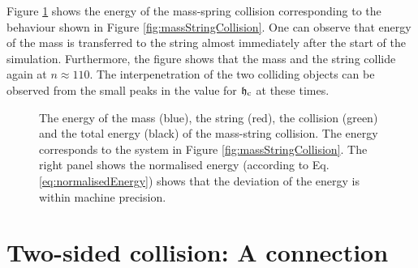 Figure \ref{fig:massStringCollisionEnergy} shows the energy of the mass-spring collision corresponding to the behaviour shown in Figure \ref{fig:massStringCollision}. One can observe that energy of the mass is transferred to the string almost immediately after the start of the simulation. Furthermore, the figure shows that the mass and the string collide again at $n\approx 110$. The interpenetration of the two colliding objects can be observed from the small peaks in the value for $\mathfrak{h}_{\text{c}}$ at these times. 

\begin{figure}[h]
    \centering
      \caption{The energy of the mass (blue), the string (red), the collision (green) and the total energy (black) of the mass-string collision. The energy corresponds to the system in Figure \ref{fig:massStringCollision}. The right panel shows the normalised energy (according to Eq. \eqref{eq:normalisedEnergy}) shows that the deviation of the energy is within machine precision. \label{fig:massStringCollisionEnergy}}
\end{figure}
\section{Two-sided collision: A connection}\label{sec:twoSidedCollision}

